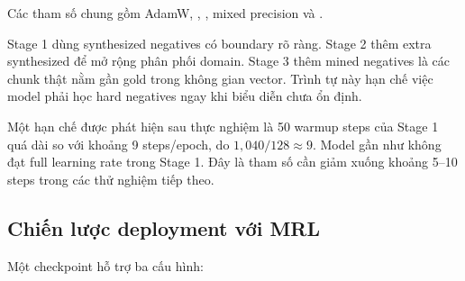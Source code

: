 \documentclass[../DoAn.tex]{subfiles}
\begin{document}
\begin{table}[H]
    \centering
    \caption{Cấu hình curriculum training cho embedding}
    \label{tab:curriculum-config}
    {\small
    \setlength{\tabcolsep}{3pt}
    }
\end{table}

Các tham số chung gồm AdamW, , , mixed precision và .

Stage 1 dùng synthesized negatives có boundary rõ ràng. Stage 2 thêm extra synthesized để mở rộng phân phối domain. Stage 3 thêm mined negatives là các chunk thật nằm gần gold trong không gian vector. Trình tự này hạn chế việc model phải học hard negatives ngay khi biểu diễn chưa ổn định.

Một hạn chế được phát hiện sau thực nghiệm là 50 warmup steps của Stage 1 quá dài so với khoảng 9 steps/epoch, do $1,040/128\approx9$. Model gần như không đạt full learning rate trong Stage 1. Đây là tham số cần giảm xuống khoảng 5--10 steps trong các thử nghiệm tiếp theo.

\subsection{Chiến lược deployment với MRL}
\label{subsection:4.3.4}

Một checkpoint hỗ trợ ba cấu hình:
\end{document}
